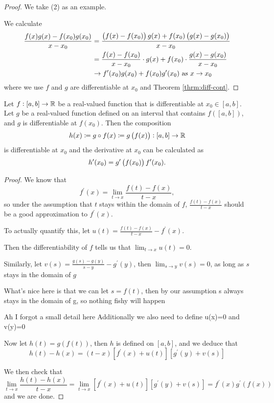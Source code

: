 \begin{proof}
We take (2) as an example.

We calculate
\begin{align*}
\frac{f(x)g(x)-f(x_0)g(x_0)}{x-x_0}&=\frac{\left(f(x)-f(x_0)\right)g(x)+f(x_0)\left(g(x)-g(x_0)\right)}{x-x_0}\\
&=\frac{f(x)-f(x_0)}{x-x_0}\cdot g(x)+f(x_0)\cdot\frac{g(x)-g(x_0)}{x-x_0}\\
&\to f^\prime(x_0)g(x_0)+f(x_0)g^\prime(x_0)\text{ as }x\to x_0
\end{align*}
where we use $f$ and $g$ are differentiable at $x_0$ and Theorem \ref{thrm:diff-cont}.
\end{proof}

\begin{theorem}
Let $f:[a,b]\to\mathbb R$ be a real-valued function that is differentiable at $x_0\in[a,b]$. Let $g$ be a real-valued function defined on an interval that contains $f([a,b])$, and $g$ is differentiable at $f(x_0)$. Then the composition
\[ h(x)\coloneqq g\circ f(x)\coloneqq g\left(f(x)\right):[a,b]\to\mathbb R \]
is differentiable at $x_0$ and the derivative at $x_0$ can be calculated as
\[ h^\prime(x_0)=g^\prime\left(f(x_0)\right)f^\prime(x_0). \]
\end{theorem}

\begin{proof}
We know that
\[ f^\prime(x)=\lim_{t\to x}\frac{f(t)-f(x)}{t-x}, \]
so under the assumption that $t$ stays within the domain of $f$, $\frac{f(t)-f(x)}{t-x}$ should be a good approximation to $f^\prime(x)$.

To actually quantify this, let $u(t)=\frac{f(t)-f(x)}{t-x}-f^\prime(x)$.

Then the differentiability of $f$ tells us that $\lim_{t\to x}u(t)=0$.

Similarly, let $v(s)=\frac{g(s)-g(y)}{s-y}-g^\prime(y)$, then $\lim_{s\to y}v(s)=0$, as long as $s$ stays in the domain of $g$

What's nice here is that we can let $s=f(t)$, then by our assumption s always stays in the domain of g, so nothing fishy will happen

Ah I forgot a small detail here
Additionally we also need to define u(x)=0 and v(y)=0

Now let $h(t)=g(f(t))$, then $h$ is defined on $[a,b]$, and we deduce that
\[ h(t)-h(x)=(t-x)[f^\prime(x)+u(t)][g^\prime(y)+v(s)] \]

We then check that
\[ \lim_{t\to x}\frac{h(t)-h(x)}{t-x} = \lim_{t\to x}[f^\prime(x)+u(t)][g^\prime(y)+v(s)] = f^\prime(x)g^\prime(f(x)) \]
and we are done.
\end{proof}

